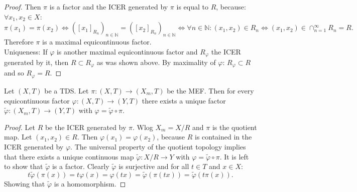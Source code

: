 \begin{proof}
  Then $\pi$ is a factor and the ICER generated by $\pi$ is equal to $R$, because: $\forall x_1,x_2 \in X$:
  \begin{equation*}
    \pi(x_1) = \pi (x_2) \Leftrightarrow ([x_1]_{R_n})_{n\in \mathbb{N}} = ([x_2]_{R_n})_{n\in \mathbb{N}}
    \Leftrightarrow \forall n \in \mathbb{N} : (x_1, x_2 ) \in R_n
    \Leftrightarrow (x_1,x_2) \in \cap_{n=1}^\infty R_n = R.
  \end{equation*}
  Therefore $\pi$ is a maximal equicontinuous factor.\\
  Uniqueness:
  If $\varphi$ is another maximal equicontinuous factor and $R_\varphi$ the ICER generated by it, then $R \subset R_\varphi$ as was shown above.
  By maximality of $\varphi$: $R_\varphi \subset R$ and so $R_\varphi = R$.
\end{proof}

\begin{proposition}
  Let $(X,T)$ be a TDS. Let $\pi : (X, T) \to  (X_m,T)$ be the MEF.
  Then for every equicontinuous factor $\varphi : (X,T) \to (Y,T)$ there exists a unique factor $\tilde{\varphi}: (X_m,T) \to (Y,T)$ with $\varphi = \tilde{\varphi} \circ \pi$.
\end{proposition}
\begin{proof}
  Let $R$ be the ICER generated by $\pi$.
  Wlog $X_m = X/R$ and $\pi$ is the quotient map.
  Let $(x_1, x_2) \in R$. Then $\varphi (x_1) = \varphi (x_2)$, because $R$ is contained in the ICER generated by $\varphi$.
  The universal property of the quotient topology implies that there exists a unique continuous map $\tilde{\varphi}: X/R \to Y$ with $\varphi = \tilde{\varphi}\circ \pi$.
  It is left to show that $\tilde{\varphi}$ is a factor.
  Clearly $\tilde{\varphi}$ is surjective and for all $t\in T$ and $x \in X$:
  \begin{equation*}
    t \tilde{\varphi} (\pi(x)) =  t \varphi (x) = \varphi (tx) = \tilde{\varphi}(\pi (tx)) = \tilde{\varphi}(t \pi (x)) .
  \end{equation*}
  Showing that $\tilde{\varphi}$ is a homomorphism.
\end{proof}
